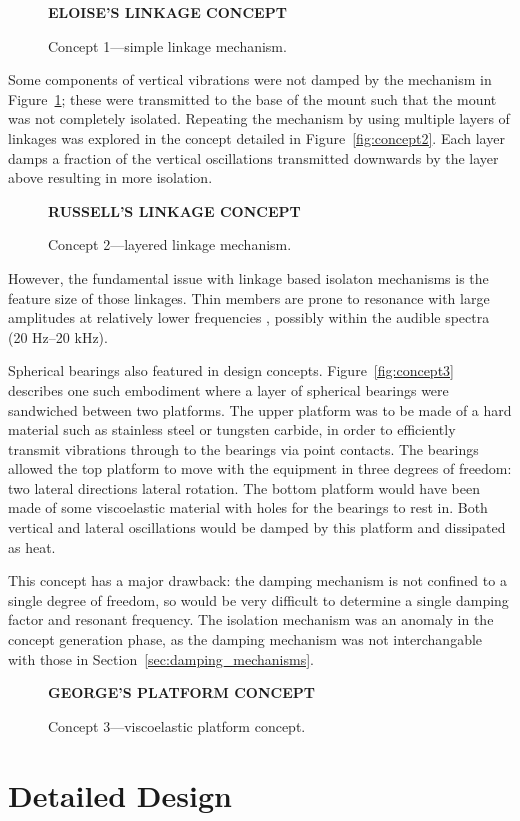 \documentclass{article}
\begin{document}
\begin{figure}[h] 
    \centering
    \textbf{ELOISE'S LINKAGE CONCEPT}
    \caption{Concept 1---simple linkage mechanism.}
    \label{fig:concept1}
\end{figure}

Some components of vertical vibrations were not damped by the mechanism in 
Figure~\ref{fig:concept1}; these were transmitted to the base of the mount such 
that the mount was not completely isolated. Repeating the mechanism by using 
multiple layers of linkages was explored in the concept detailed in 
Figure~\vref{fig:concept2}. Each layer damps a fraction of the vertical 
oscillations transmitted downwards by the layer above resulting in more 
isolation.

\begin{figure}[h]
    \centering
    \textbf{RUSSELL'S LINKAGE CONCEPT}
    \caption{Concept 2---layered linkage mechanism.}
    \label{fig:concept2}
\end{figure}

However, the fundamental issue with linkage based isolaton mechanisms is the 
feature size of those linkages. Thin members are prone to resonance with large 
amplitudes at relatively lower frequencies \cite{citation needed}, possibly 
within the audible spectra (20 Hz--20 kHz).

Spherical bearings also featured in design concepts. Figure~\vref{fig:concept3}
describes one such embodiment where a layer of spherical bearings were
sandwiched between two platforms. The upper platform was to be made of a hard 
material such as stainless steel or tungsten carbide, in order to efficiently 
transmit vibrations through to the bearings via point contacts. The bearings 
allowed the top platform to move with the equipment in three degrees of 
freedom: two lateral directions lateral rotation. The bottom platform would 
have been made of some viscoelastic material with holes for the bearings to 
rest in. Both vertical and lateral oscillations would be damped by this 
platform and dissipated as heat.

This concept has a major drawback: the damping mechanism is not confined to a 
single degree of freedom, so would be very difficult to determine a single 
damping factor and resonant frequency. The isolation mechanism was an anomaly 
in the concept generation phase, as the damping mechanism was not 
interchangable with those in Section~\vref{sec:damping_mechanisms}.



\begin{figure}[h]
    \centering
    \textbf{GEORGE'S PLATFORM CONCEPT}
    \caption{Concept 3---viscoelastic platform concept.}
    \label{fig:concept3}
\end{figure}
    
\section{Detailed Design}
    
\end{document}
